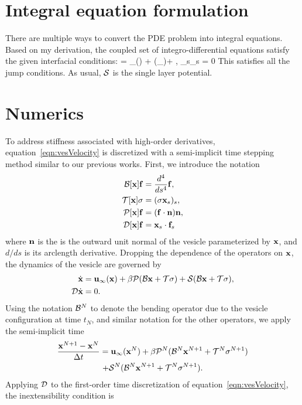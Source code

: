 \documentclass[aps,prl,twocolumn,showpacs]{revtex4}
\begin{document}
\section{Integral equation formulation}
There are multiple ways to convert the PDE problem into integral
equations. Based on my derivation, the coupled set of
integro-differential equations satisfy the given interfacial conditions:
\beq 
  \dot{\mbx} = \mbu_\infty(\mbx) + \beta (\mbf_\cdot\mbn)\mbn + , 
  \label{eqn:vesVelocity}
\eeq
\beq 
  \mbx_s\cdot\dot{\mbx}_s = 0 
\eeq
This satisfies all the jump conditions. As usual, $\mathcal{S}$ is the single layer potential. 

\section{Numerics}
To address stiffness associated with high-order derivatives,
equation~\eqref{eqn:vesVelocity} is discretized with a semi-implicit
time stepping method similar to our previous works.  First, we introduce
the notation
\begin{align}
  \mathcal{B}[\mathbf{x}]\mathbf{f} &= \frac{d^4}{ds^4} \mathbf{f}, \\
  \mathcal{T}[\mathbf{x}]\sigma &= (\sigma \mathbf{x}_s)_s, \\
  \mathcal{P}[\mathbf{x}]\mathbf{f} &= (\mathbf{f} \cdot \mathbf{n}) \mathbf{n}, \\
  \mathcal{D}[\mathbf{x}]\mathbf{f} &= \mathbf{x}_s \cdot \mathbf{f}_s
\end{align}
where $\mathbf{n}$ is the is the outward unit normal of the vesicle
parameterized by $\mathbf{x}$, and $d/ds$ is its arclength derivative.
Dropping the dependence of the operators on $\mathbf{x}$, the dynamics of the
vesicle are governed by
\begin{align}
  \dot{\mathbf{x}} &= \mathbf{u}_{\infty}(\mathbf{x}) + 
  \beta \mathcal{P}(\mathcal{B}\mathbf{x} + \mathcal{T}\sigma) + \mathcal{S}(\mathcal{B}\mathbf{x} + \mathcal{T}\sigma), \\
  \mathcal{D} \dot{\mathbf{x}} &= 0.
\end{align}
Using the notation $\mathcal{B}^N$ to denote the bending operator due to the
vesicle configuration at time $t_N$, and similar notation for the other
operators, we apply the semi-implicit time
\begin{multline}  
  \frac{\mathbf{x}^{N+1} - \mathbf{x}^N}{\Delta t} = \mathbf{u}_\infty(\mathbf{x}^N) 
  + \beta \mathcal{P}^N(\mathcal{B}^N\mathbf{x}^{N+1} + \mathcal{T}^N\sigma^{N+1})  \\
  + \mathcal{S}^N(\mathcal{B}^N\mathbf{x}^{N+1} + \mathcal{T}^N\sigma^{N+1}).
\end{multline}
Applying $\mathcal{D}$ to the first-order time discretization of
equation~\eqref{eqn:vesVelocity}, the inextensibility condition is
\end{document}
